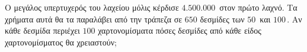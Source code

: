 Ο μεγάλος υπερτυχερός του λαχείου μόλις κέρδισε $ 4.500.000 $\officialeuro\,  στον πρώτο λαχνό. Τα χρήματα αυτά θα τα παραλάβει από την τράπεζα σε $ 650 $ δεσμίδες των $ 50 $\officialeuro\, και $ 100 $\officialeuro\,. Αν κάθε δεσμίδα περιέχει $ 100 $ χαρτονομίσματα πόσες δεσμίδες από κάθε είδος χαρτονομίσματος θα χρειαστούν;
